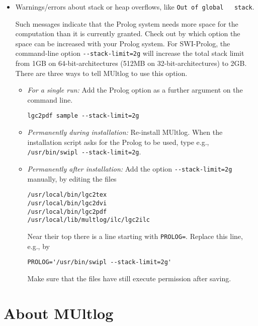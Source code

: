 \documentclass[
]{article}
\newcommand{\passthrough}[1]{#1}
\begin{document}
\begin{itemize}
\item
  Warnings/errors about stack or heap overflows, like
  \passthrough{\lstinline!Out of global   stack!}.

  Such messages indicate that the Prolog system needs more space for the
  computation than it is currently granted. Check out by which option
  the space can be increased with your Prolog system. For SWI-Prolog,
  the command-line option \passthrough{\lstinline!--stack-limit=2g!}
  will increase the total stack limit from 1GB on 64-bit-architectures
  (512MB on 32-bit-architectures) to 2GB. There are three ways to tell
  MUltlog to use this option.

  \begin{itemize}
  \item
    \emph{For a single run:} Add the Prolog option as a further argument
    on the command line.

\begin{lstlisting}
lgc2pdf sample --stack-limit=2g
\end{lstlisting}
  \item
    \emph{Permanently during installation:} Re-install MUltlog. When the
    installation script asks for the Prolog to be used, type e.g.,
    \passthrough{\lstinline!/usr/bin/swipl --stack-limit=2g!}.
  \item
    \emph{Permanently after installation:} Add the option
    \passthrough{\lstinline!--stack-limit=2g!} manually, by editing the
    files

\begin{lstlisting}
/usr/local/bin/lgc2tex
/usr/local/bin/lgc2dvi
/usr/local/bin/lgc2pdf
/usr/local/lib/multlog/ilc/lgc2ilc
\end{lstlisting}

    Near their top there is a line starting with
    \passthrough{\lstinline!PROLOG=!}. Replace this line, e.g., by

\begin{lstlisting}
PROLOG='/usr/bin/swipl --stack-limit=2g'
\end{lstlisting}

    Make sure that the files have still execute permission after saving.
  \end{itemize}
\end{itemize}

\hypertarget{about-multlog}{%
\section{About MUltlog}\label{about-multlog}}
\end{document}

